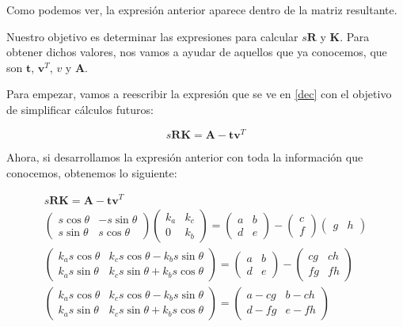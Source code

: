 \documentclass[11pt,a4paper]{article}
\begin{document}
Como podemos ver, la expresión anterior aparece dentro de la matriz
resultante.

Nuestro objetivo es determinar las expresiones para calcular
$s\mathbf{R}$ y $\mathbf{K}$. Para obtener dichos valores, nos
vamos a ayudar de aquellos que ya conocemos, que son
$\mathbf{t}$, $\mathbf{v}^T$, $v$ y $\mathbf{A}$.

Para empezar, vamos a reescribir la expresión que se ve en \eqref{dec}
con el objetivo de simplificar cálculos futuros:

\begin{equation}
	 s\mathbf{RK} = \mathbf{A} - \mathbf{tv}^T
\end{equation}

Ahora, si desarrollamos la expresión anterior con toda la información
que conocemos, obtenemos lo siguiente:

\begin{gather*}
s\mathbf{RK} = \mathbf{A} - \mathbf{tv}^T \\
\begin{pmatrix}
s\cos\theta & -s\sin\theta \\
s\sin\theta & s\cos\theta
\end{pmatrix}
\begin{pmatrix}
k_a & k_c \\
0 & k_b
\end{pmatrix}
=
\begin{pmatrix}
a & b \\ d & e
\end{pmatrix}
-
\begin{pmatrix}
c \\ f
\end{pmatrix}
\begin{pmatrix}
g & h
\end{pmatrix}
\\
\begin{pmatrix}
k_as\cos\theta & k_cs\cos\theta - k_bs\sin\theta \\
k_as\sin\theta & k_cs\sin\theta + k_bs\cos\theta
\end{pmatrix}
=
\begin{pmatrix}
a & b \\ d & e
\end{pmatrix}
-
\begin{pmatrix}
cg & ch \\
fg & fh
\end{pmatrix}
\\
\begin{pmatrix}
k_as\cos\theta & k_cs\cos\theta - k_bs\sin\theta \\
k_as\sin\theta & k_cs\sin\theta + k_bs\cos\theta
\end{pmatrix}
=
\begin{pmatrix}
a-cg & b-ch \\ d-fg & e-fh
\end{pmatrix}
\end{gather*}
\end{document}
